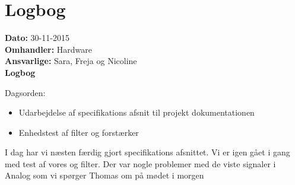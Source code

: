\section{Logbog}

\textbf{Dato:} 30-11-2015 \\
\textbf{Omhandler:} Hardware \\
\textbf{Ansvarlige:} Sara, Freja og Nicoline \\
\textbf{Logbog}

Dagsorden:
\begin{itemize}
	\item Udarbejdelse af specifikations afsnit til projekt dokumentationen
	\item Enhedstest af filter og forstærker
\end{itemize}
I dag har vi næsten færdig gjort specifikations afsnittet. Vi er igen gået i gang med test af vores og filter. Der var nogle problemer med de viste signaler i Analog som vi spørger Thomas om på mødet i morgen\\

